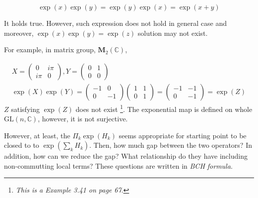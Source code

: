 \begin{equation}
    \exp(x) \exp(y) = \exp(y) \exp(x) = \exp(x+y)
\end{equation}

It holds true. However, such expression does not hold in general case and moreover, 
$\exp(x)\exp(y) = \exp(z)$ solution may not exist.

For example, in matrix group, $\mathbf{M}_2 (\mathbb{C})$,

\begin{eqnarray}
    X = \begin{pmatrix}
        0     & i \pi \\
        i \pi & 0 
    \end{pmatrix}, 
    Y = \begin{pmatrix}
        0     & 1 \\
        0     & 0 
    \end{pmatrix} \\
    \exp(X) \exp(Y) =  
    \begin{pmatrix}
        -1  & 0 \\
        0   & -1 
    \end{pmatrix}
    \begin{pmatrix}
        1 & 1 \\
        0 & 1 
    \end{pmatrix} =
    \begin{pmatrix}
        -1     & -1 \\
        0 & -1 
    \end{pmatrix} = \exp(Z) \label{eq:non-exist-expz}
\end{eqnarray}
$Z$ satisfying $\exp(Z)$ does not exist
\cite{hall2015lie}\footnote[4]{
    \textit{This is a Example 3.41 on page 67}.
}. The exponential map is defined on whole $\text{GL}(n, \mathbb{C})$, however, 
it is not surjective.

However, at least, the $\Pi_k \exp\left(H_k\right)$
seems appropriate for starting point to be closed to
to $\exp\left( \sum_k H_k \right)$.
Then, how much gap between the two operators? 
In addition, how can we reduce the gap?
What relationship do they have including non-commutting local terms?
These questions are written in \textit{BCH formula}\cite{suzuki_convergence_1977}.


